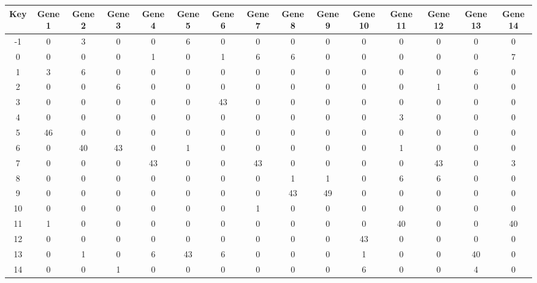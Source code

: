 \begin{tabular}{|c|c|c|c|c|c|c|c|c|c|c|c|c|c|c|}
\hline
Key & Gene 1 & Gene 2 & Gene 3 & Gene 4 & Gene 5 & Gene 6 & Gene 7 & Gene 8 & Gene 9 & Gene 10 & Gene 11 & Gene 12 & Gene 13 & Gene 14 \\
\hline
-1 & 0 & 3 & 0 & 0 & 6 & 0 & 0 & 0 & 0 & 0 & 0 & 0 & 0 & 0 \\
0 & 0 & 0 & 0 & 1 & 0 & 1 & 6 & 6 & 0 & 0 & 0 & 0 & 0 & 7 \\
1 & 3 & 6 & 0 & 0 & 0 & 0 & 0 & 0 & 0 & 0 & 0 & 0 & 6 & 0 \\
2 & 0 & 0 & 6 & 0 & 0 & 0 & 0 & 0 & 0 & 0 & 0 & 1 & 0 & 0 \\
3 & 0 & 0 & 0 & 0 & 0 & 43 & 0 & 0 & 0 & 0 & 0 & 0 & 0 & 0 \\
4 & 0 & 0 & 0 & 0 & 0 & 0 & 0 & 0 & 0 & 0 & 3 & 0 & 0 & 0 \\
5 & 46 & 0 & 0 & 0 & 0 & 0 & 0 & 0 & 0 & 0 & 0 & 0 & 0 & 0 \\
6 & 0 & 40 & 43 & 0 & 1 & 0 & 0 & 0 & 0 & 0 & 1 & 0 & 0 & 0 \\
7 & 0 & 0 & 0 & 43 & 0 & 0 & 43 & 0 & 0 & 0 & 0 & 43 & 0 & 3 \\
8 & 0 & 0 & 0 & 0 & 0 & 0 & 0 & 1 & 1 & 0 & 6 & 6 & 0 & 0 \\
9 & 0 & 0 & 0 & 0 & 0 & 0 & 0 & 43 & 49 & 0 & 0 & 0 & 0 & 0 \\
10 & 0 & 0 & 0 & 0 & 0 & 0 & 1 & 0 & 0 & 0 & 0 & 0 & 0 & 0 \\
11 & 1 & 0 & 0 & 0 & 0 & 0 & 0 & 0 & 0 & 0 & 40 & 0 & 0 & 40 \\
12 & 0 & 0 & 0 & 0 & 0 & 0 & 0 & 0 & 0 & 43 & 0 & 0 & 0 & 0 \\
13 & 0 & 1 & 0 & 6 & 43 & 6 & 0 & 0 & 0 & 1 & 0 & 0 & 40 & 0 \\
14 & 0 & 0 & 1 & 0 & 0 & 0 & 0 & 0 & 0 & 6 & 0 & 0 & 4 & 0 \\
\hline
\end{tabular}